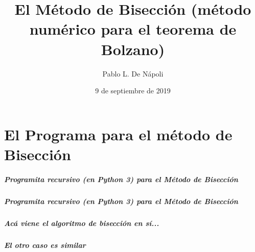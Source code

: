 \documentclass[11pt]{beamer}
\begin{document}
 
 

\title[Bisección]{El Método de Bisección (método numérico para el teorema de Bolzano) }
\author{Pablo L. De Nápoli}
\date{9 de septiembre de 2019}



\maketitle

\part{El Programa para el método de Bisección}

\frame{\partpage}
\begin{frame}
\frametitle{Programita recursivo (en Python 3) para el Método de
Bisección}


\frametitle{}



\end{frame}


\begin{frame} 

\frametitle{Programita recursivo (en Python 3) para el Método de
Bisección}


\frametitle{Acá viene el algoritmo de bisección en sí...}



\end{frame}
\begin{frame}


\frametitle{El otro caso es similar}



\end{frame}
\end{document}
